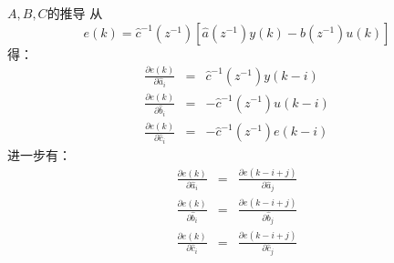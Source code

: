 
\begin{frame}{$A,B,C$的推导}
从
$$
e(k) = \hat c^{-1}(z^{-1})[\hat a(z^{-1})y(k)-\hat b(z^{-1})u(k)]
$$
得：
\begin{eqnarray*}
\frac{\partial e(k)}{\partial \hat a_i} &=& \hat c^{-1}(z^{-1})y(k-i) \\
\frac{\partial e(k)}{\partial \hat b_i} &=& -\hat c^{-1}(z^{-1})u(k-i) \\
\frac{\partial e(k)}{\partial \hat c_i} &=& -\hat c^{-1}(z^{-1})e(k-i) 
\end{eqnarray*}
进一步有：
\begin{eqnarray*}
\frac{\partial e(k)}{\partial \hat a_i} &=& \frac{\partial e(k-i+j)}{\partial \hat a_j} \\
\frac{\partial e(k)}{\partial \hat b_i} &=& \frac{\partial e(k-i+j)}{\partial \hat b_j} \\
\frac{\partial e(k)}{\partial \hat c_i} &=&  \frac{\partial e(k-i+j)}{\partial \hat c_j} 
\end{eqnarray*}

\end{frame}

